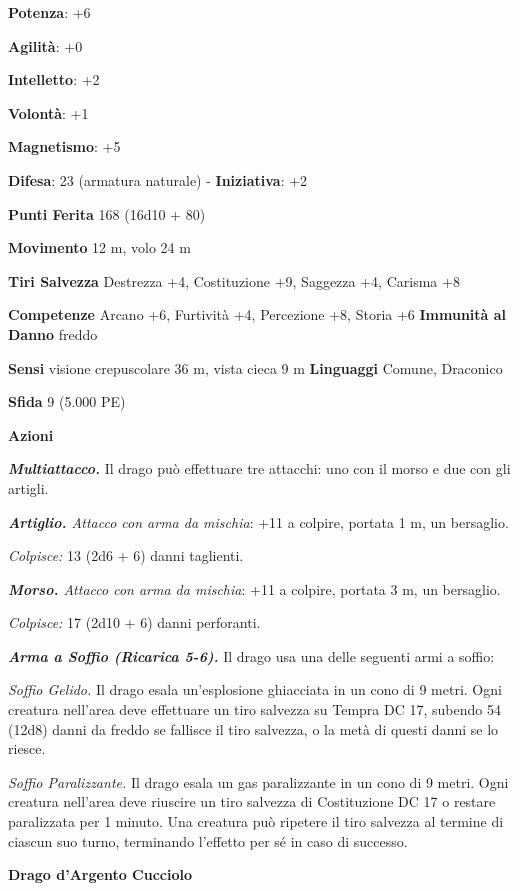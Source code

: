 \begin{multicols}{2}
\textbf{Potenza}: +6

\textbf{Agilità}: +0

\textbf{Intelletto}: +2

\textbf{Volontà}: +1

\textbf{Magnetismo}: +5

\textbf{Difesa}: 23 (armatura naturale) - \textbf{Iniziativa}: +2

\textbf{Punti Ferita} 168 (16d10 + 80)

\textbf{Movimento} 12 m, volo 24 m

\textbf{Tiri Salvezza} Destrezza +4, Costituzione +9, Saggezza +4,
Carisma +8

\textbf{Competenze} Arcano +6, Furtività +4, Percezione +8, Storia +6
\textbf{Immunità al Danno} freddo

\textbf{Sensi} visione crepuscolare 36 m, vista cieca 9 m
\textbf{Linguaggi} Comune, Draconico

\textbf{Sfida} 9 (5.000 PE)\smallskip

\smallskip\textbf{Azioni}

\emph{\textbf{Multiattacco.}} Il drago può effettuare tre attacchi: uno
con il morso e due con gli artigli.

\emph{\textbf{Artiglio.} Attacco con arma da mischia}: +11 a colpire,
portata 1 m, un bersaglio.

\emph{Colpisce:} 13 (2d6 + 6) danni taglienti.

\emph{\textbf{Morso.} Attacco con arma da mischia}: +11 a colpire,
portata 3 m, un bersaglio.

\emph{Colpisce:} 17 (2d10 + 6) danni perforanti.

\emph{\textbf{Arma a Soffio (Ricarica 5-6).}} Il drago usa una delle
seguenti armi a soffio:

\emph{Soffio Gelido.} Il drago esala un'esplosione ghiacciata in un cono
di 9 metri. Ogni creatura nell'area deve effettuare un tiro salvezza su Tempra DC 17, subendo 54 (12d8) danni da freddo se fallisce il
tiro salvezza, o la metà di questi danni se lo riesce.

\emph{Soffio Paralizzante.} Il drago esala un gas paralizzante in un
cono di 9 metri. Ogni creatura nell'area deve riuscire un tiro salvezza
di Costituzione DC 17 o restare paralizzata per 1 minuto. Una creatura
può ripetere il tiro salvezza al termine di ciascun suo turno,
terminando l'effetto per sé in caso di successo.

\textbf{Drago d'Argento Cucciolo}


\end{multicols}

